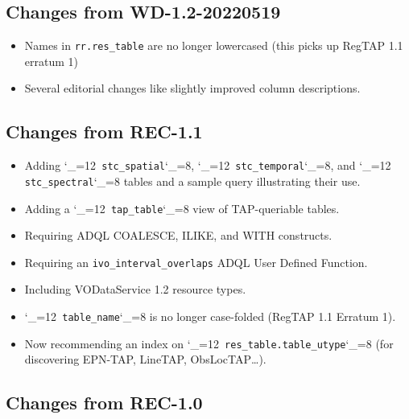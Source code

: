 \documentclass[11pt,a4paper]{ivoa}
\makeatletter
\def\rtent#1{\texttt{\color{rtcolor}\verb|#1|}}
\def\makeunderscoreletter{\catcode`\_=12}
\def\makeunderscoresubscript{\catcode`\_=8}
\def\rtent{\makeunderscoreletter\relax\rt@nt}
\def\rt@nt#1{\texttt{\color{rtcolor} #1}\makeunderscoresubscript{}}
\makeatother
\begin{document}
\subsection{Changes from WD-1.2-20220519}

\begin{itemize}
\item Names in \verb|rr.res_table| are no longer lowercased (this
picks up RegTAP 1.1 erratum 1)
\item Several editorial changes like slightly improved column
descriptions.
\end{itemize}

\subsection{Changes from REC-1.1}

\begin{itemize}
\item Adding \rtent{stc_spatial}, \rtent{stc_temporal}, and
\rtent{stc_spectral} tables and a sample query illustrating their use.
\item Adding a \rtent{tap_table} view of TAP-queriable tables.
\item Requiring ADQL COALESCE, ILIKE, and WITH constructs.
\item Requiring an \texttt{ivo\_interval\_overlaps} ADQL User Defined
Function.
\item Including VODataService 1.2 resource types.
\item \rtent{table_name} is no longer case-folded (RegTAP 1.1 Erratum 1).
\item Now recommending an index on \rtent{res_table.table_utype} (for
discovering EPN-TAP, LineTAP, ObsLocTAP\dots).
\end{itemize}

\subsection{Changes from REC-1.0}
\end{document}
